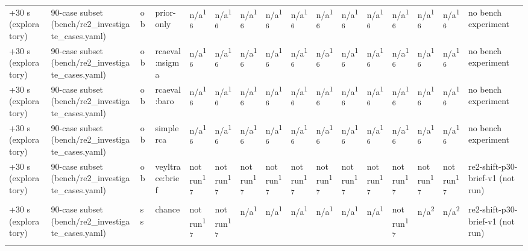 \begin{table}[t]
\begin{tabular}{llllllllllllllll}
+30 s (exploratory) & 90-case subset (bench/re2\_investigate\_cases.yaml) & ob & prior-only & n/a\textsuperscript{16} & n/a\textsuperscript{16} & n/a\textsuperscript{16} & n/a\textsuperscript{16} & n/a\textsuperscript{16} & n/a\textsuperscript{16} & n/a\textsuperscript{16} & n/a\textsuperscript{16} & n/a\textsuperscript{16} & n/a\textsuperscript{16} & n/a\textsuperscript{16} & no bench experiment \\
+30 s (exploratory) & 90-case subset (bench/re2\_investigate\_cases.yaml) & ob & rcaeval:nsigma & n/a\textsuperscript{16} & n/a\textsuperscript{16} & n/a\textsuperscript{16} & n/a\textsuperscript{16} & n/a\textsuperscript{16} & n/a\textsuperscript{16} & n/a\textsuperscript{16} & n/a\textsuperscript{16} & n/a\textsuperscript{16} & n/a\textsuperscript{16} & n/a\textsuperscript{16} & no bench experiment \\
+30 s (exploratory) & 90-case subset (bench/re2\_investigate\_cases.yaml) & ob & rcaeval:baro & n/a\textsuperscript{16} & n/a\textsuperscript{16} & n/a\textsuperscript{16} & n/a\textsuperscript{16} & n/a\textsuperscript{16} & n/a\textsuperscript{16} & n/a\textsuperscript{16} & n/a\textsuperscript{16} & n/a\textsuperscript{16} & n/a\textsuperscript{16} & n/a\textsuperscript{16} & no bench experiment \\
+30 s (exploratory) & 90-case subset (bench/re2\_investigate\_cases.yaml) & ob & simplerca & n/a\textsuperscript{16} & n/a\textsuperscript{16} & n/a\textsuperscript{16} & n/a\textsuperscript{16} & n/a\textsuperscript{16} & n/a\textsuperscript{16} & n/a\textsuperscript{16} & n/a\textsuperscript{16} & n/a\textsuperscript{16} & n/a\textsuperscript{16} & n/a\textsuperscript{16} & no bench experiment \\
+30 s (exploratory) & 90-case subset (bench/re2\_investigate\_cases.yaml) & ob & veyltrace:brief & not run\textsuperscript{17} & not run\textsuperscript{17} & not run\textsuperscript{17} & not run\textsuperscript{17} & not run\textsuperscript{17} & not run\textsuperscript{17} & not run\textsuperscript{17} & not run\textsuperscript{17} & not run\textsuperscript{17} & not run\textsuperscript{17} & not run\textsuperscript{17} & re2-shift-p30-brief-v1 (not run) \\
+30 s (exploratory) & 90-case subset (bench/re2\_investigate\_cases.yaml) & ss & chance & not run\textsuperscript{17} & not run\textsuperscript{17} & n/a\textsuperscript{1} & n/a\textsuperscript{1} & n/a\textsuperscript{1} & n/a\textsuperscript{1} & n/a\textsuperscript{1} & n/a\textsuperscript{1} & not run\textsuperscript{17} & n/a\textsuperscript{2} & n/a\textsuperscript{2} & re2-shift-p30-brief-v1 (not run) \\

\end{tabular}
\end{table}
